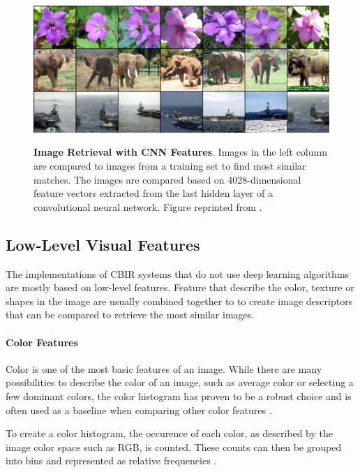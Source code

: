 \documentclass[12pt]{report}
\begin{document}
\begin{figure}[h]
\centering
{\includegraphics[width=\linewidth]{02_background/CBIR/cnn_cbir}}
\caption{\label{fig:conv_cbir} \textbf{Image Retrieval with CNN Features}. Images in the left column are compared to images from a training set to find most similar matches. The images are compared based on 4028-dimensional feature vectors extracted from the last hidden layer of a convolutional neural network. Figure reprinted from \cite{NIPS2012_4824}.}
\end{figure}


\pagebreak
\subsection{Low-Level Visual Features}
The implementations of CBIR systems that do not use deep learning algorithms are mostly based on low-level features. Feature that describe the color, texture or shapes in the image are usually combined together to to create image descriptors that can be compared to retrieve the most similar images.

\paragraph{Color Features}
Color is one of the most basic features of an image. While there are many possibilities to describe the color of an image, such as average color or selecting a few dominant colors, the color histogram has proven to be a robust choice and is often used as a baseline when comparing other color features \cite{Torres_content-basedimage}.

To create a color histogram, the occurence of each color, as described by the image color space such as RGB, is counted. These counts can then be grouped into bins and represented as relative frequencies \cite{Swain1991}.
\end{document}
